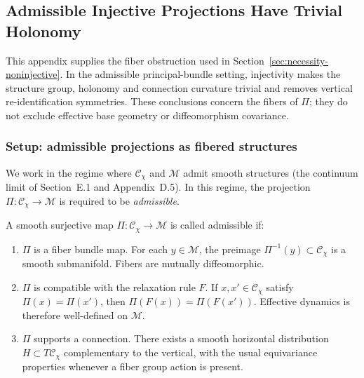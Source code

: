 \subsection{Admissible Injective Projections Have Trivial Holonomy}
  \label{subsec:injective-holonomy}

  This appendix supplies the fiber obstruction used in Section~\ref{sec:necessity-noninjective}.
  In the admissible principal-bundle setting, injectivity makes the structure group, holonomy and connection
  curvature trivial and removes vertical re-identification symmetries.
  These conclusions concern the fibers of $\Pi$; they do not exclude effective base geometry or
  diffeomorphism covariance.

  \subsubsection*{Setup: admissible projections as fibered structures}
    \label{subsec:stepA-setup}

    We work in the regime where $\mathcal{C}_\chi$ and $\mathcal{M}$ admit smooth structures
    (the continuum limit of Section~E.1 and Appendix~D.5).
    In this regime, the projection $\Pi : \mathcal{C}_\chi \to \mathcal{M}$ is required to be \emph{admissible}.

    \begin{definition}
      \label{def:admissible-projection}
      A smooth surjective map $\Pi : \mathcal{C}_\chi \to \mathcal{M}$ is called admissible if:
      \begin{enumerate}[label=(A\arabic*)]
  \item \label{A1}
  $\Pi$ is a fiber bundle map.
  For each $y \in \mathcal{M}$, the preimage $\Pi^{-1}(y) \subset \mathcal{C}_\chi$ is a smooth submanifold.
  Fibers are mutually diffeomorphic.
  \item \label{A2}
  $\Pi$ is compatible with the relaxation rule $F$.
  If $x, x' \in \mathcal{C}_\chi$ satisfy $\Pi(x) = \Pi(x')$, then $\Pi(F(x)) = \Pi(F(x'))$.
  Effective dynamics is therefore well-defined on $\mathcal{M}$.
  \item \label{A3}
  $\Pi$ supports a connection.
  There exists a smooth horizontal distribution $H \subset T\mathcal{C}_\chi$ complementary to the vertical,
  with the usual equivariance properties whenever a fiber group action is present.
      \end{enumerate}
    \end{definition}

